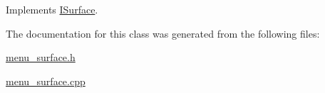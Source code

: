 Implements \mbox{\hyperlink{class_i_surface_ae0b5040cd0eaa1897f61f994f7b2eacf}{I\+Surface}}.



The documentation for this class was generated from the following files\+:\begin{DoxyCompactItemize}
\item 
\mbox{\hyperlink{menu__surface_8h}{menu\+\_\+surface.\+h}}\item 
\mbox{\hyperlink{menu__surface_8cpp}{menu\+\_\+surface.\+cpp}}\end{DoxyCompactItemize}
